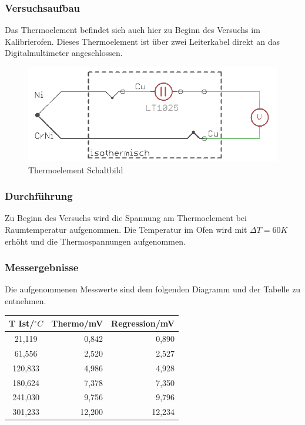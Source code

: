 \documentclass[a4paper,11pt,oneside]{article}
\begin{document}
\subsubsection{Versuchsaufbau}
Das Thermoelement befindet sich auch hier zu Beginn des Versuchs im Kalibrierofen. Dieses Thermoelement ist über zwei Leiterkabel direkt an das Digitalmultimeter angeschlossen. \\
\begin{figure}[h]
\centering
\includegraphics[scale=0.8]{Bilder/Aufg2Schaltbild1.png}
\caption{Thermoelement Schaltbild}
\end{figure}
\subsubsection{Durchführung}
Zu Beginn des Versuchs wird die Spannung am Thermoelement bei Raumtemperatur aufgenommen. Die Temperatur im Ofen wird mit $\Delta T = 60K$ erhöht und die Thermospannungen aufgenommen. 
\subsubsection{Messergebnisse}
Die aufgenommenen Messwerte sind dem folgenden Diagramm und der Tabelle zu entnehmen.

\begin{center}
\begin{tabular}{|c|r|r|}
\hline 
T Ist/$^\circ C$ & Thermo/mV & Regression/mV \\ 
\hline 
21,119 & 0,842 & 0,890 \\ 
\hline 
61,556 & 2,520 & 2,527\\ 
\hline 
120,833 & 4,986 & 4,928\\ 
\hline 
180,624 & 7,378 & 7,350\\ 
\hline 
241,030 & 9,756 & 9,796\\ 
\hline 
301,233 & 12,200 & 12,234\\ 
\hline 
\end{tabular} 
\end{center}
\end{document}
